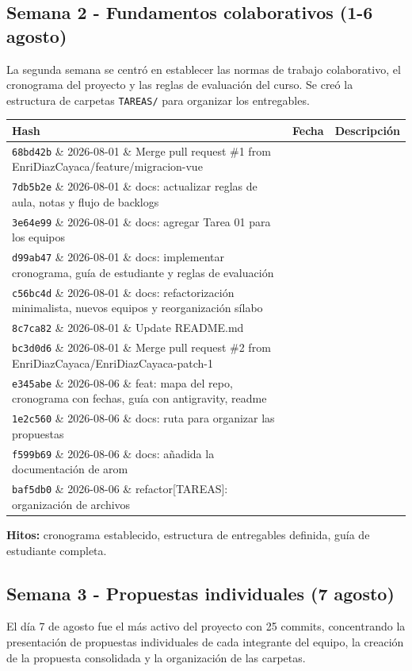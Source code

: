\documentclass[11pt,a4paper]{article}
\begin{document}
\subsection{Semana 2 - Fundamentos colaborativos (1-6 agosto)}
La segunda semana se centró en establecer las normas de trabajo colaborativo, el cronograma del proyecto y las reglas de evaluación del curso. Se creó la estructura de carpetas \texttt{TAREAS/} para organizar los entregables.

\begin{table}[htbp]
\centering
\small
\begin{tabularx}{\textwidth}{llX}
\toprule
\textbf{Hash} & \textbf{Fecha} & \textbf{Descripción} \\
\midrule
\texttt{68bd42b} \& 2026-08-01 \& Merge pull request \#1 from EnriDiazCayaca/feature/migracion-vue \\
\texttt{7db5b2e} \& 2026-08-01 \& docs: actualizar reglas de aula, notas y flujo de backlogs \\
\texttt{3e64e99} \& 2026-08-01 \& docs: agregar Tarea 01 para los equipos \\
\texttt{d99ab47} \& 2026-08-01 \& docs: implementar cronograma, guía de estudiante y reglas de evaluación \\
\texttt{c56bc4d} \& 2026-08-01 \& docs: refactorización minimalista, nuevos equipos y reorganización sílabo \\
\texttt{8c7ca82} \& 2026-08-01 \& Update README.md \\
\texttt{bc3d0d6} \& 2026-08-01 \& Merge pull request \#2 from EnriDiazCayaca/EnriDiazCayaca-patch-1 \\
\texttt{e345abe} \& 2026-08-06 \& feat: mapa del repo, cronograma con fechas, guía con antigravity, readme \\
\texttt{1e2c560} \& 2026-08-06 \& docs: ruta para organizar las propuestas \\
\texttt{f599b69} \& 2026-08-06 \& docs: añadida la documentación de arom \\
\texttt{baf5db0} \& 2026-08-06 \& refactor[TAREAS]: organización de archivos \\
\bottomrule
\end{tabularx}
\end{table}
\textbf{Hitos:} cronograma establecido, estructura de entregables definida, guía de estudiante completa.

\subsection{Semana 3 - Propuestas individuales (7 agosto)}
El día 7 de agosto fue el más activo del proyecto con 25 commits, concentrando la presentación de propuestas individuales de cada integrante del equipo, la creación de la propuesta consolidada y la organización de las carpetas.
\end{document}
